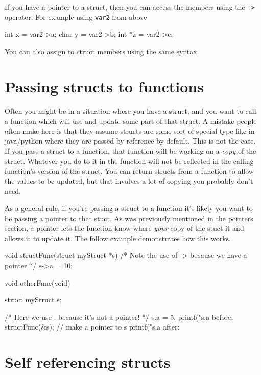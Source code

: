 If you have a pointer to a struct, then you can access the members using the \texttt{->} operator.
For example using \texttt{var2} from above

\begin{codeblock}
int x = var2->a;
char y = var2->b;
int *z = var2->c;
\end{codeblock}

You can also assign to struct members using the same syntax.

\section{Passing structs to functions}

Often you might be in a situation where you have a struct, and you want to call a function which will use and update some part of that struct.
A mistake people often make here is that they assume structs are some sort of special type like in java/python where they are passed by reference by default.
This is not the case.
If you pass a struct to a function, that function will be working on a \emph{copy} of the struct.
Whatever you do to it in the function will not be reflected in the calling function's version of the struct.
You can return structs from a function to allow the values to be updated, but that involves a lot of copying you probably don't need.

As a general rule, if you're passing a struct to a function it's likely you want to be passing a pointer to that stuct.
As was previously mentioned in the pointers section, a pointer lets the function know where \emph{your} copy of the stuct it and allows it to update it.
The follow example demonstrates how this works.

\begin{codeblock}
void
structFunc(struct myStruct *s)
{
    /* Note the use of -> because we have a pointer */
    s->a = 10;
}

void
otherFunc(void)
{
    struct myStruct s;

    /* Here we use . because it's not a pointer! */
    s.a = 5;
    printf("s.a before: %
    structFunc(&s); // make a pointer to s
    printf("s.a after: %
}
\end{codeblock}

\section{Self referencing structs}

